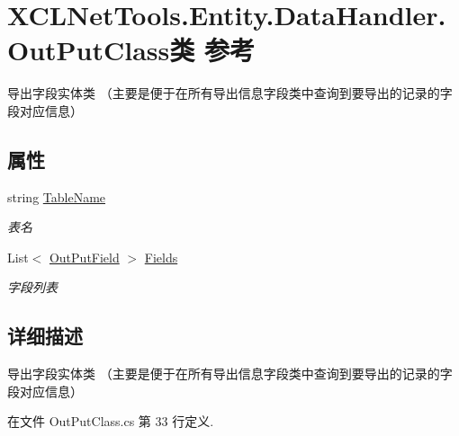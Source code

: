 \hypertarget{class_x_c_l_net_tools_1_1_entity_1_1_data_handler_1_1_out_put_class}{\section{X\-C\-L\-Net\-Tools.\-Entity.\-Data\-Handler.\-Out\-Put\-Class类 参考}
\label{class_x_c_l_net_tools_1_1_entity_1_1_data_handler_1_1_out_put_class}
}


导出字段实体类 （主要是便于在所有导出信息字段类中查询到要导出的记录的字段对应信息）  


\subsection*{属性}
\begin{DoxyCompactItemize}
\item 
string \hyperlink{class_x_c_l_net_tools_1_1_entity_1_1_data_handler_1_1_out_put_class_ab4c63943c19492123db3d04eeaa4dbe1}{Table\-Name}
\begin{DoxyCompactList}\small\item\em 表名 \end{DoxyCompactList}\item 
List$<$ \hyperlink{class_x_c_l_net_tools_1_1_entity_1_1_data_handler_1_1_out_put_field}{Out\-Put\-Field} $>$ \hyperlink{class_x_c_l_net_tools_1_1_entity_1_1_data_handler_1_1_out_put_class_a7621d8ecd1d8f1f7bb04736dc658509a}{Fields}
\begin{DoxyCompactList}\small\item\em 字段列表 \end{DoxyCompactList}\end{DoxyCompactItemize}


\subsection{详细描述}
导出字段实体类 （主要是便于在所有导出信息字段类中查询到要导出的记录的字段对应信息） 



在文件 Out\-Put\-Class.\-cs 第 33 行定义.




